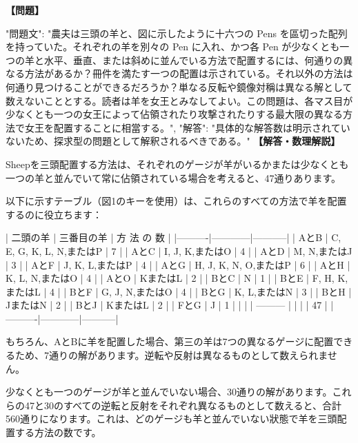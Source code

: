 \documentclass[10pt,a4paper,oneside,openany]{ltjsbook}
\begin{document}
\begin{tcolorbox}[colback=softblue,colframe=primaryblue,title=\textbf{第 310 問：THE THREE SHEEP.},arc=2mm,boxrule=1pt,breakable]
\textbf{【問題】}\par\vspace{0.3em}
{
"問題文": "農夫は三頭の羊と、図に示したように十六つの Pens を區切った配列を持っていた。それぞれの羊を別々の Pen に入れ、かつ各 Pen が少なくとも一つの羊と水平、垂直、または斜めに並んでいる方法で配置するには、何通りの異なる方法があるか？冊件を満たす一つの配置は示されている。それ以外の方法は何通り見つけることができるだろうか？単なる反転や鏡像対稱は異なる解として数えないこととする。読者は羊を女王とみなしてよい。この問題は、各マス目が少なくとも一つの女王によって佔領されたり攻撃されたりする最大限の異なる方法で女王を配置することに相當する。",
"解答": "具体的な解答数は明示されていないため、探求型の問題として解釈されるべきである。"
}
\tcblower
\textbf{【解答・数理解説】}\par\vspace{0.3em}
Sheepを三頭配置する方法は、それぞれのゲージが羊がいるかまたは少なくとも一つの羊と並んでいて常に佔領されている場合を考えると、47通りあります。

以下に示すテーブル（図1のキーを使用）は、これらのすべての方法で羊を配置するのに役立ちます：

| 二頭の羊 | 三番目の羊 | 方 法 の 数 |
|----------|------------|-----------|
| AとB     | C, E, G, K, L, N,またはP | 7         |
| AとC     | I, J, K,またはO          | 4         |
| AとD     | M, N,またはJ             | 3         |
| AとF     | J, K, L,またはP          | 4         |
| AとG     | H, J, K, N, O,またはP    | 6         |
| AとH     | K, L, N,またはO          | 4         |
| AとO     | KまたはL                | 2         |
| BとC     | N                     | 1         |
| BとE     | F, H, K,またはL          | 4         |
| BとF     | G, J, N,またはO          | 4         |
| BとG     | K, L,またはN             | 3         |
| BとH     | JまたはN                | 2         |
| BとJ     | KまたはL                | 2         |
| FとG     | J                     | 1         |
|          |               | --------- |
|          |               | 47        |
|----------|------------|-----------|

もちろん、AとBに羊を配置した場合、第三の羊は7つの異なるゲージに配置できるため、7通りの解があります。逆転や反射は異なるものとして数えられません。

少なくとも一つのゲージが羊と並んでいない場合、30通りの解があります。これらの47と30のすべての逆転と反射をそれぞれ異なるものとして数えると、合計560通りになります。これは、どのゲージも羊と並んでいない狀態で羊を三頭配置する方法の数です。


\end{tcolorbox}
\end{document}
